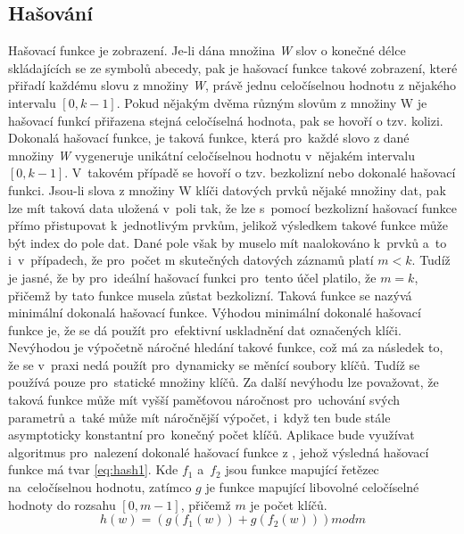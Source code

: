 \documentclass[11pt,twoside,a4paper]{book}
\begin{document}
\subsection {\label{SEC:hashN} Hašování}
Hašovací funkce je zobrazení. Je-li dána množina \textit{W} slov o konečné délce skládajících se ze symbolů abecedy, pak je hašovací funkce takové zobrazení, které přiřadí každému slovu z množiny \textit{W}, právě jednu celočíselnou hodnotu z nějakého intervalu $[0,k-1]$. Pokud nějakým dvěma různým slovům z množiny W je hašovací funkcí přiřazena stejná celočíselná hodnota, pak se hovoří o tzv. kolizi.
Dokonalá hašovací funkce, je taková funkce, která pro~každé slovo z dané množiny \textit{W} vygeneruje unikátní celočíselnou hodnotu v~nějakém intervalu $[0,k-1]$. V~takovém případě se hovoří o tzv. bezkolizní nebo dokonalé hašovací funkci. Jsou-li slova z množiny W klíči datových prvků nějaké množiny dat, pak lze mít taková data uložená v~poli tak, že lze s~pomocí bezkolizní hašovací funkce přímo přistupovat k~jednotlivým prvkům, jelikož výsledkem takové funkce může být index do pole dat. Dané pole však by muselo mít naalokováno k~prvků a~to i~v~případech, že pro~počet m skutečných datových záznamů platí $m<k$. Tudíž je jasné, že by pro~ideální hašovací funkci pro~tento účel platilo, že $m=k$, přičemž by tato funkce musela zůstat bezkolizní. Taková funkce se nazývá minimální dokonalá hašovací funkce.
Výhodou minimální dokonalé hašovací funkce je, že se dá použít pro~efektivní uskladnění dat označených klíči. Nevýhodou je výpočetně náročné hledání takové funkce, což má za následek to, že se v~praxi nedá použít pro~dynamicky se měnící soubory klíčů. Tudíž se používá pouze pro~statické množiny klíčů. Za další nevýhodu lze považovat, že taková funkce může mít vyšší paměťovou náročnost pro~uchování svých parametrů a~také může mít náročnější výpočet, i~když ten bude stále asymptoticky konstantní pro~konečný počet klíčů.
Aplikace bude využívat algoritmus pro~nalezení dokonalé hašovací funkce z \cite{bib:hashPerfect}, jehož výsledná hašovací funkce má tvar \ref{eq:hash1}.
Kde $f_1$ a~$f_2$ jsou funkce mapující řetězec na~celočíselnou hodnotu, zatímco $g$ je funkce mapující libovolné celočíselné hodnoty do rozsahu $[0,m-1]$, přičemž $m$ je počet klíčů. 
\begin{equation} \label{eq:hash1}
h(w) = (g(f_1(w))+g(f_2(w))) mod m
\end{equation}
\end{document}
